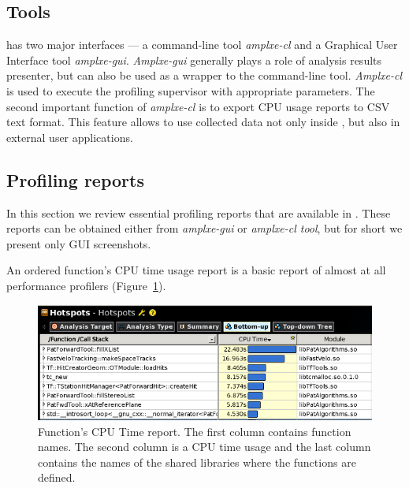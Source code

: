 \documentclass[a4paper]{jpconf}
\begin{document}
\subsection{Tools}

\amp has two major interfaces --- a command-line tool {\it amplxe-cl} and a Graphical User Interface 
tool {\it amplxe-gui}. {\it Amplxe-gui} generally plays a role of analysis results presenter, but can also be used as 
a wrapper to the  command-line tool. {\it Amplxe-cl} is used to execute the profiling supervisor with appropriate 
parameters.  The second important function of {\it amplxe-cl} is to export CPU usage reports to CSV text format. 
This feature allows to use collected data not only inside \amp, but also in external user applications. 

\subsection{Profiling reports}

In this section we review essential profiling reports that are available in \amp. These reports can be obtained either 
from {\it amplxe-gui} or {\it amplxe-cl tool}, but for short we present only GUI screenshots.

An ordered function’s CPU time usage report is a basic report of almost at all performance profilers (Figure~\ref{fig01}).

\begin{figure}[H]
\begin{minipage}{\textwidth}
\includegraphics[width=\textwidth]{figs/fig01.png}
\caption{\label{fig01}Function’s CPU Time report. The first column contains function names. The second column is a CPU 
time usage and the last column contains the names of the shared libraries where the functions are defined.}
\end{minipage}
\end{figure}
\end{document}
